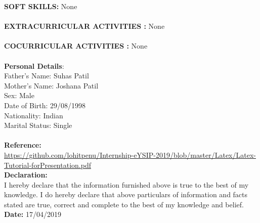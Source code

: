 \documentclass{article}
\begin{document}
\large \textbf{SOFT SKILLS:}	
None\\
\\
\large \textbf{EXTRACURRICULAR ACTIVITIES
:}	
None\\
\\
\large \textbf{COCURRICULAR ACTIVITIES
:}	
None\\
\\
\large \textbf{Personal Details}:\\
Father’s Name: Suhas Patil \\
Mother’s Name: Joshana Patil \\
Sex: Male \\
Date of Birth: 29/08/1998 \\
Nationality: Indian \\
Marital Status: Single \\
\\
\large \textbf{Reference:}\\
\href{Link}{https://github.com/lohitpenu/Internship-eYSIP-2019/blob/master/Latex/Latex-Tutorial-forPresentation.pdf} \\	

\large \textbf{Declaration: }\\
I hereby declare that the information furnished above is true to the best of my knowledge. I do hereby declare that above particulars of information and facts stated are true, correct and complete to the best of my knowledge and belief.\\

\large \textbf{Date: } 17/04/2019\\
\end{document}
